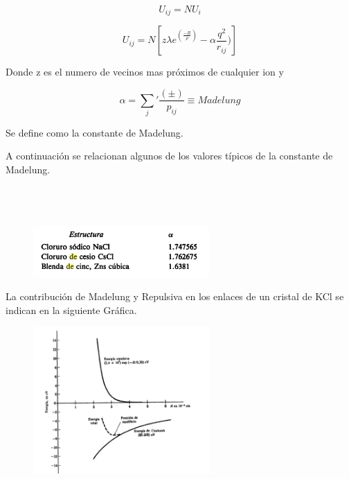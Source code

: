 \documentclass{article}
\begin{document}
\begin{equation}
   U_{ij}=NU_i 
    \label{eq2}
\end{equation}

\begin{equation}
   U_{ij}=N\left[z\lambda e^{(\frac{-R}{\rho})}-\alpha\frac{q^2}{r_{ij}} )\right]
    \label{eq2}
\end{equation}

Donde z es el numero de vecinos mas próximos de cualquier ion y 

\begin{equation}
 \alpha = \sum_{j}^{} '\frac{(\pm)}{p_{ij}} \equiv Madelung
\label{eq2}
\end{equation}

Se define como la constante de Madelung.

A continuación se relacionan algunos de los valores típicos de la constante de Madelung.\\\\\\\\

\begin{figure}[h]
\centering
\includegraphics[width=0.6\textwidth]{a9.png}
\caption{}
\end{figure}

La contribución de Madelung y Repulsiva en los enlaces de un cristal de KCl se indican en la siguiente Gráfica.

\begin{figure}[h]
\centering
\includegraphics[width=0.6\textwidth]{a10.png}
\caption{}
\end{figure}
\end{document}

